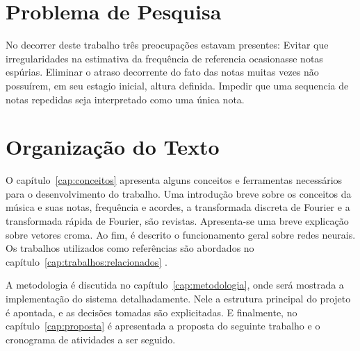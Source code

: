 \section{Problema de Pesquisa}
\label{cap:introducao:sec:problema:pesquisa}

No decorrer deste trabalho três preocupações estavam presentes:
Evitar que irregularidades na estimativa da frequência de referencia ocasionasse notas espúrias.
Eliminar o atraso decorrente do fato das notas muitas vezes não possuírem, em seu estagio inicial, altura definida.
Impedir que uma sequencia de notas repedidas seja interpretado como uma única nota.




\section{Organização do Texto}
\label{cap:introducao:sec:organizacao:texto}


O capítulo~\ref{cap:conceitos} apresenta alguns conceitos e ferramentas necessários para o desenvolvimento do trabalho. Uma introdução breve sobre os conceitos da música e suas notas, frequência e acordes, a transformada discreta de Fourier e a transformada rápida de Fourier, são revistas. Apresenta-se uma breve explicação sobre vetores croma. Ao fim, é descrito o funcionamento geral sobre redes neurais. Os trabalhos utilizados como referências são abordados no capítulo~\ref{cap:trabalhos:relacionados} .

A metodologia é discutida no capítulo~\ref{cap:metodologia}, onde será mostrada a implementação do sistema detalhadamente. Nele a estrutura principal do projeto é apontada, e as decisões tomadas são explicitadas. E finalmente, no capítulo~\ref{cap:proposta} é apresentada a proposta do seguinte trabalho e o cronograma de atividades a ser seguido. 


